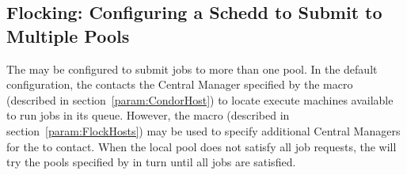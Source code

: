 \subsection{Flocking: Configuring a Schedd to Submit to Multiple Pools}
\label{sec:Flocking}

The  may be configured to submit jobs to more than one
pool.
In the default configuration, the  contacts the
Central Manager specified by the  macro (described
in section~\ref{param:CondorHost}) to locate execute machines
available to run jobs in its queue.
However, the
 macro (described in
section~\ref{param:FlockHosts}) may be used to specify additional
Central Managers for the  to contact.
When the local
pool does not satisfy all job requests, the  will try
the pools specified by  in turn until all jobs are
satisfied.
